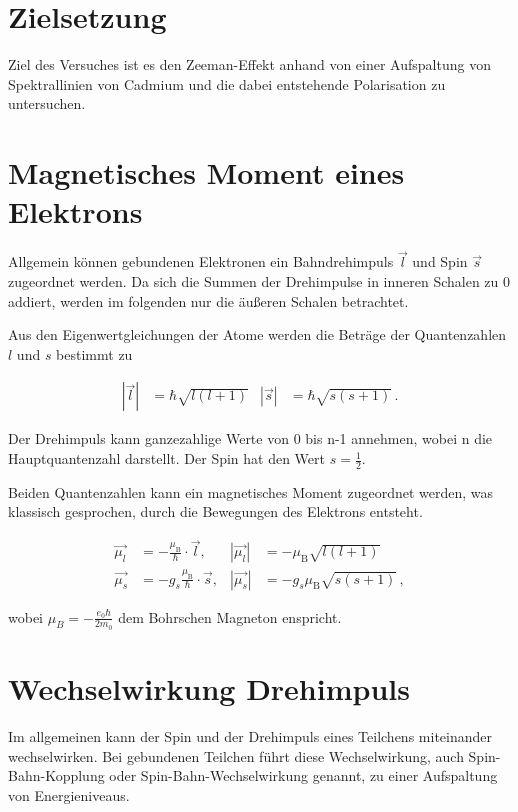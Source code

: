 \section{Zielsetzung}
Ziel des Versuches ist es den Zeeman-Effekt anhand von einer Aufspaltung von Spektrallinien von Cadmium und die dabei entstehende Polarisation zu untersuchen.

\section{Magnetisches Moment eines Elektrons}
Allgemein können gebundenen Elektronen ein Bahndrehimpuls $\vec{l}$ und Spin $\vec{s}$ zugeordnet werden. Da sich die Summen der Drehimpulse in inneren Schalen  zu 0 addiert, werden
im folgenden nur die äußeren Schalen betrachtet. 

\noindent
Aus den Eigenwertgleichungen der Atome werden die Beträge der Quantenzahlen $l$ und $s$ bestimmt zu 

\vspace{-25pt}
\begin{align}
    |\vec{l}| &= \hbar \sqrt{l(l+1)} & |\vec{s}| &= \hbar \sqrt{s(s+1)} \, .
\end{align}

\noindent
Der Drehimpuls kann ganzezahlige Werte von 0 bis n-1 annehmen, wobei n die Hauptquantenzahl darstellt. Der Spin hat den Wert $s=\frac{1}{2}$. 

\noindent
Beiden Quantenzahlen kann ein magnetisches Moment zugeordnet werden, was klassisch gesprochen, durch die Bewegungen des Elektrons entsteht. 

\vspace{-15pt}
\begin{align}
    \vec{\mu_l} &= - \frac{\mu_\text{B}}{\hbar} \cdot \vec{l}, & |\vec{\mu_l}|& = - \mu_\text{B} \sqrt{l(l+1)}\\
    \vec{\mu_s} &= - g_s \frac{\mu_\text{B}}{\hbar} \cdot \vec{s}, & |\vec{\mu_s}| &= - g_s \mu_\text{B} \sqrt{s(s+1)} \, ,
\end{align}

\noindent
wobei $\mu_B = -\frac{e_0 \hbar}{2 m_0}$ dem Bohrschen Magneton enspricht. 

\section{Wechselwirkung Drehimpuls}
Im allgemeinen kann der Spin und der Drehimpuls eines Teilchens miteinander wechselwirken. Bei gebundenen Teilchen führt 
diese Wechselwirkung, auch Spin-Bahn-Kopplung oder Spin-Bahn-Wechselwirkung genannt, zu einer Aufspaltung von Energieniveaus.


